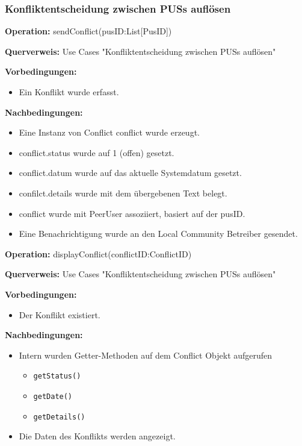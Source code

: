 \documentclass[a4paper,12pt]{article}
\begin{document}
	
	\subsubsection{Konfliktentscheidung zwischen PUSs auflösen}
	
	
	\begin{contractbox}
		\textbf{Operation:} sendConflict(pusID:List[PusID])
		
		\textbf{Querverweis:} Use Cases "Konfliktentscheidung zwischen PUSs auflösen"
		
		\textbf{Vorbedingungen:}
		\begin{itemize}[noitemsep]
			\item Ein Konflikt wurde erfasst.
		\end{itemize}
		
		\textbf{Nachbedingungen:}
		\begin{itemize}[noitemsep]
			\item Eine Instanz von Conflict conflict wurde erzeugt.
			\item conflict.status wurde auf 1 (offen) gesetzt.
			\item conflict.datum wurde auf das aktuelle Systemdatum gesetzt.
			\item confilct.details wurde mit dem übergebenen Text belegt.
			\item conflict wurde mit PeerUser assoziiert,
			basiert auf der pusID.
			\item Eine Benachrichtigung wurde an den Local Community Betreiber gesendet.
		\end{itemize}
	\end{contractbox}
	
	\begin{contractbox}
		\textbf{Operation:} displayConflict(conflictID:ConflictID)
		
		\textbf{Querverweis:} Use Cases "Konfliktentscheidung zwischen PUSs auflösen"
		
		\textbf{Vorbedingungen:}
		\begin{itemize}[noitemsep]
			\item Der Konflikt existiert.
		\end{itemize}
		
		\textbf{Nachbedingungen:}
		\begin{itemize}[noitemsep]
			\item Intern wurden Getter-Methoden auf dem Conflict Objekt aufgerufen
			\begin{itemize}
				\item \texttt{getStatus()}
				\item \texttt{getDate()}
				\item \texttt{getDetails()}
			\end{itemize}
			\item Die Daten des Konflikts werden angezeigt.
		\end{itemize}
	\end{contractbox}
	
\end{document}

